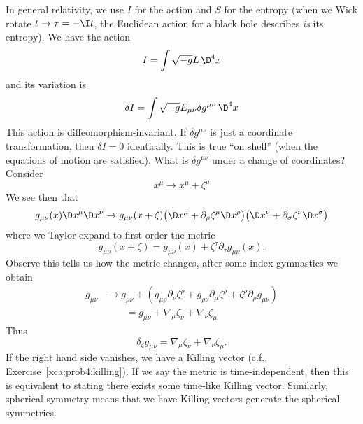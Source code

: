 In general relativity, we use $I$ for the action and $S$ for the
entropy (when we Wick rotate $t\to\tau=-\I t$, the Euclidean action for a
black hole describes \emph{is} its entropy). We have the action
\begin{equation}
I=\int\sqrt{-g}L\,\D^{4}x
\end{equation}
and its variation is
\begin{equation}
\delta I=\int\sqrt{-g}E_{\mu\nu}\delta g^{\mu\nu}\,\D^{4}x
\end{equation}
This action is diffeomorphism-invariant. If $\delta g^{\mu\nu}$
is just a coordinate transformation, then $\delta I=0$ identically.
This is true ``on shell'' (when the equations of motion are
satisfied). What is $\delta g^{\mu\nu}$ under a change of
coordinates?
Consider
\begin{equation}
x^{\mu}\to x^{\mu}+\zeta^{\mu}
\end{equation}
We see then that
\begin{equation}
g_{\mu\nu}(x)\D x^{\mu}\D x^{\nu}
\to g_{\mu\nu}(x+\zeta)
\bigl(\D x^{\mu}+\partial_{\rho}\zeta^{\mu}\D x^{\rho}\bigr)
\bigl(\D x^{\nu}+\partial_{\sigma}\zeta^{\nu}\D x^{\sigma}\bigr)
\end{equation}
where we Taylor expand to first order the metric
\begin{equation}
g_{\mu\nu}(x+\zeta)=g_{\mu\nu}(x)+\zeta^{\tau}\partial_{\tau}g_{\mu\nu}(x).
\end{equation}
Observe this tells us how the metric changes, after some index
gymnastics we obtain
\begin{equation}
\begin{split}
g_{\mu\nu}&\to g_{\mu\nu}+(g_{\mu\rho}\partial_{\nu}\zeta^{\rho}+g_{\rho\nu}\partial_{\mu}\zeta^{\rho}+\zeta^{\rho}\partial_{\rho}g_{\mu\nu})\\
&\qquad=g_{\mu\nu}+\nabla_{\mu}\zeta_{\nu}+\nabla_{\nu}\zeta_{\mu}
\end{split}
\end{equation}
Thus
\begin{equation}\label{eq:lec16:killingVec}
\delta_{\zeta}g_{\mu\nu}=\nabla_{\mu}\zeta_{\nu}+\nabla_{\nu}\zeta_{\mu}.
\end{equation}
If the right hand side vanishes, we have a Killing vector (c.f.,
Exercise~\ref{xca:prob4:killing}). If we say the metric is
time-independent, then this is equivalent to stating there exists
some time-like Killing vector. Similarly, spherical symmetry
means that we have Killing vectors generate the spherical symmetries.

